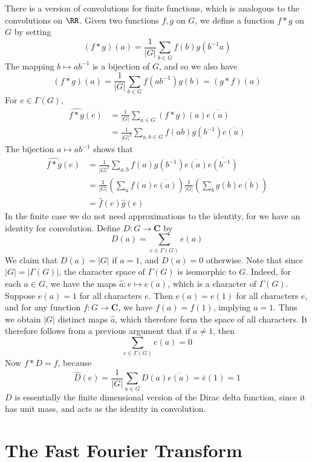 There is a version of convolutions for finite functions, which is analogous to the convolutions on $\RR$. Given two functions $f,g$ on $G$, we define a function $f * g$ on $G$ by setting
%
\[ (f * g)(a) = \frac{1}{|G|} \sum_{b \in G} f(b) g(b^{-1} a) \]
%
The mapping $b \mapsto ab^{-1}$ is a bijection of $G$, and so we also have
%
\[ (f * g)(a) = \frac{1}{|G|} \sum_{b \in G} f(ab^{-1}) g(b) = (g * f)(a) \]
%
For $e \in \Gamma(G)$,
%
\begin{align*}
    \widehat{f * g}(e) &= \frac{1}{|G|} \sum_{a \in G} (f*g)(a) \overline{e(a)}\\
    &= \frac{1}{|G|^2} \sum_{a,b \in G} f(ab) g(b^{-1}) \overline{e(a)}
\end{align*}
%
The bijection $a \mapsto ab^{-1}$ shows that
%
\begin{align*}
    \widehat{f*g}(e) &= \frac{1}{|G|^2} \sum_{a,b} f(a) g(b^{-1}) \overline{e(a)} \overline{e(b^{-1})}\\
    &= \frac{1}{|G|} \left( \sum_a f(a) \overline{e(a)} \right) \frac{1}{|G|} \left( \sum_b g(b) \overline{e(b)} \right)\\
    &= \widehat{f}(e) \widehat{g}(e)
\end{align*}
%
In the finite case we do not need approximations to the identity, for we have an identity for convolution. Define $D: G \to \mathbf{C}$ by
%
\[ D(a) = \sum_{e \in \Gamma(G)} e(a) \]
%
We claim that $D(a) = |G|$ if $a = 1$, and $D(a) = 0$ otherwise. Note that since $|G| = |\Gamma(G)|$, the character space of $\Gamma(G)$ is isomorphic to $G$. Indeed, for each $a \in G$, we have the maps $\widehat{a}: e \mapsto e(a)$, which is a character of $\Gamma(G)$. Suppose $e(a) = 1$ for all characters $e$. Then $e(a) = e(1)$ for all characters $e$, and for any function $f: G \to \mathbf{C}$, we have $f(a) = f(1)$, implying $a = 1$. Thus we obtain $|G|$ distinct maps $\widehat{a}$, which therefore form the space of all characters. It therefore follows from a previous argument that if $a \neq 1$, then
%
\[ \sum_{e \in \Gamma(G)} e(a) = 0 \]
%
Now $f * D = f$, because
%
\[ \widehat{D}(e) = \frac{1}{|G|} \sum_{a \in G} D(a) \overline{e(a)} = \overline{e}(1) = 1 \]
%
$D$ is essentially the finite dimensional version of the Dirac delta function, since it has unit mass, and acts as the identity in convolution.

\section{The Fast Fourier Transform}

